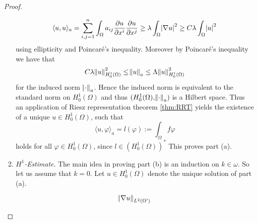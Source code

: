 \begin{proof}
\begin{enumerate}[label = \textit{Step \arabic*:},wide=0pt]
			\begin{equation*}
				\langle u,u\rangle_a = \sum_{i,j = 1}^n \int_\Omega a_{ij} \frac{\partial u}{\partial x^i}\frac{\partial u}{\partial x^j} \geq \lambda \int_\Omega\abs{\nabla u}^2 \geq C \lambda \int_\Omega \abs{u}^2
			\end{equation*}
			\noindent using ellipticity and Poincar\'e's inequality. Moreover by Poincar\'e's inequality we have that
			\begin{equation*}
				C \lambda \norm{u}^2_{H^1_0(\Omega)} \leq \norm{u}_a \leq \Lambda \norm{u}_{H^1_0(\Omega)}^2
			\end{equation*}
			\noindent for the induced norm $\norm{\cdot}_a$. Hence the induced norm is equivalent to the standard norm on $H^1_0(\Omega)$ and thus $(H^1_0(\Omega),\norm{\cdot}_a)$ is a Hilbert space. Thus an application of Riesz representation theorem \ref{thm:RRT} yields the existence of a unique $u \in H^1_0(\Omega)$, such that
			\begin{equation*}
				\langle u,\varphi \rangle_a = l(\varphi) := \int_\Omega f \varphi
			\end{equation*}
			\noindent holds for all $\varphi \in H^1_0(\Omega)$, since $l \in (H^1_0(\Omega))^*$ This proves part (a).
		\item \textit{$H^1$-Estimate.} The main idea in proving part (b) is an induction on $k \in \omega$. So let us assume that $k = 0$. Let $u \in H^1_0(\Omega)$ denote the unique solution of part (a).
			\begin{lemma}
				\label{lem:H^1_estimate}
				\begin{equation*}
					\norm{\nabla u}_{L^2(\Omega')}
				\end{equation*}
			\end{lemma}
	\end{enumerate}
\end{proof}

\printbibliography

